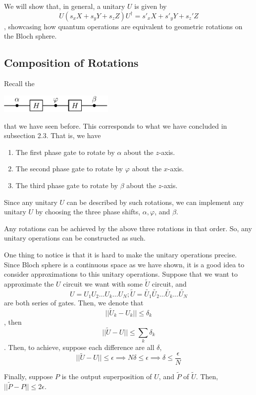 \documentclass[12pt]{article}
\begin{document}
\begin{proposition}
We will show that, in general, a unitary $U$ is given by $$
U(s_x X + s_y Y + s_z Z) U^\dag = s'_xX + s'_yY + s_z'Z
$$, showcasing how quantum operations are equivalent to geometric rotations on the Bloch sphere.
\end{proposition}

\subsection{Composition of Rotations}
Recall the
\begin{center}
\includegraphics[width = 15em]{images/6.jpg}
\end{center}
that we have seen before. This corresponds to what we have concluded in subsection 2.3. That is, we have
\begin{enumerate}
    \item The first phase gate to rotate by $\alpha$ about the $z$-axis.
    \item The second phase gate to rotate by $\varphi$ about the $x$-axis.
    \item The third phase gate to rotate by $\beta$ about the $z$-axis.
\end{enumerate}

Since any unitary $U$ can be described by such rotations, we can implement any unitary $U$ by choosing the three phase shifts, $\alpha, \varphi$, and $\beta$.

\begin{proposition}
Any rotations can be achieved by the above three rotations in that order. So, any unitary operations can be constructed as such.
\end{proposition}

\begin{remark}
One thing to notice is that it is hard to make the unitary operations precise. Since Bloch sphere is a continuous space as we have shown, it is a good idea to consider approximations to this unitary operations.
Suppose that we want to approximate the $U$ circuit we want with some $\widetilde{U}$ circuit, and $$
U = U_1U_2\ldots U_k\ldots U_N; \widetilde{U} = \widetilde{U_1}\widetilde{U_2}\ldots \widetilde{U_k}\ldots \widetilde{U_N}
$$ are both series of gates. Then, we denote that $$
||\widetilde{U}_k - U_k|| \leq \delta_k
$$, then $$
||\widetilde{U} - U|| \leq \underset{k}{\sum}\delta_k
$$. Then, to achieve, suppose each difference are all $\delta$, $$
||\widetilde{U} - U|| \leq \epsilon \implies N\delta \leq \epsilon\implies \delta \leq \frac{\epsilon}{N}
$$

Finally, suppose $P$ is the output superposition of $U$, and $\widetilde{P}$ of $\widetilde{U}$. Then, $||\widetilde{P} - P||\leq 2\epsilon$.
\end{remark}
\end{document}
